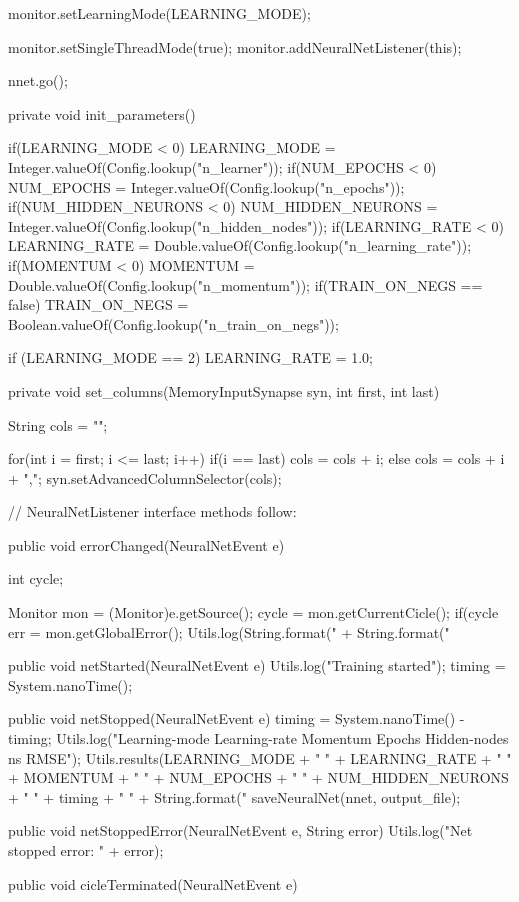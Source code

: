 \documentclass[12pt,a4,notitlepage]{report}
\renewcommand{\_}{\texttt{\symbol{95}}}
\newcommand{\<}{\texttt{\symbol{60}}}
\renewcommand{\>}{\texttt{\symbol{62}}}
\begin{document}
\begin{code}
{{		monitor.setLearningMode(LEARNING_MODE);
				
		monitor.setSingleThreadMode(true);
		monitor.addNeuralNetListener(this);
			
		nnet.go();
	}
	
	private void init_parameters()
	{
		if(LEARNING_MODE < 0)
			LEARNING_MODE = Integer.valueOf(Config.lookup("n_learner"));
		if(NUM_EPOCHS < 0)
			NUM_EPOCHS = Integer.valueOf(Config.lookup("n_epochs"));
		if(NUM_HIDDEN_NEURONS < 0)
			NUM_HIDDEN_NEURONS = Integer.valueOf(Config.lookup("n_hidden_nodes"));
		if(LEARNING_RATE < 0)
			LEARNING_RATE = Double.valueOf(Config.lookup("n_learning_rate"));
		if(MOMENTUM < 0)
			MOMENTUM = Double.valueOf(Config.lookup("n_momentum"));
		if(TRAIN_ON_NEGS == false)
			TRAIN_ON_NEGS = Boolean.valueOf(Config.lookup("n_train_on_negs"));
		
		if (LEARNING_MODE == 2)
		{
			LEARNING_RATE = 1.0;
		}
	}
	
	private void set_columns(MemoryInputSynapse syn, int first, int last)
	{
		String cols = "";
		
		for(int i = first; i <= last; i++)
		{
			if(i == last)
				cols = cols + i;
			else
				cols = cols + i + ",";
		}
		syn.setAdvancedColumnSelector(cols);
	}
		
	// NeuralNetListener interface methods follow:
	
	public void errorChanged(NeuralNetEvent e)
	{
		int cycle;
		
		Monitor mon = (Monitor)e.getSource();
		cycle = mon.getCurrentCicle();
		if(cycle %
		{
			err = mon.getGlobalError();
			Utils.log(String.format("%
			    + String.format("%
	    }
	}
	
	public void netStarted(NeuralNetEvent e)
	{
		Utils.log("Training started");
		timing = System.nanoTime();
	}
	
	public void netStopped(NeuralNetEvent e)
	{
		timing = System.nanoTime() - timing;
		Utils.log("Learning-mode Learning-rate Momentum Epochs Hidden-nodes ns RMSE");
		Utils.results(LEARNING_MODE + " " + LEARNING_RATE + " " + MOMENTUM + " " + NUM_EPOCHS + " " + NUM_HIDDEN_NEURONS + " " + timing + " " + String.format("%
		saveNeuralNet(nnet, output_file);
	}
	
	public void netStoppedError(NeuralNetEvent e, String error)
	{
		Utils.log("Net stopped error: " + error);
	}
	
	public void cicleTerminated(NeuralNetEvent e) {}
	
}
\end{code}
\end{document}
